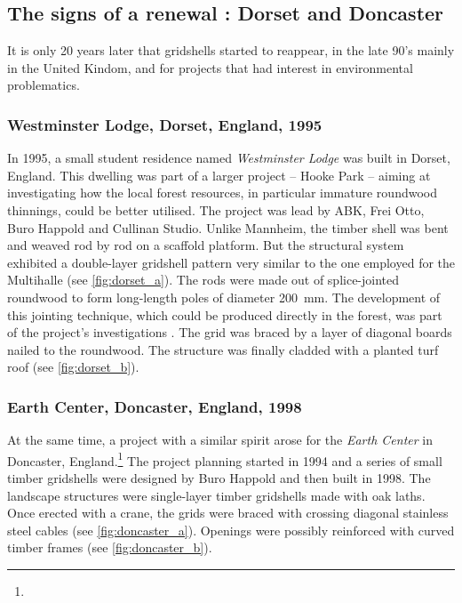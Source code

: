 \subsection{The signs of a renewal : Dorset and Doncaster}\label{sec=signs}

It is only 20 years later that gridshells started to reappear, in the late 90's mainly in the United Kindom, and for projects that had interest in environmental problematics.

\subsubsection{Westminster Lodge, Dorset, England, 1995}
In 1995, a small student residence named \emph{Westminster Lodge} was built in Dorset, England. This dwelling was part of a larger project -- Hooke Park -- aiming at investigating how the local forest resources, in particular immature roundwood thinnings, could be better utilised. The project was lead by ABK, Frei Otto, Buro Happold and Cullinan Studio. Unlike Mannheim, the timber shell was bent and weaved rod by rod on a scaffold platform. But the structural system exhibited a double-layer gridshell pattern very similar to the one employed for the Multihalle (see \cref{fig:dorset_a}). The rods were made out of splice-jointed roundwood to form long-length poles of diameter \SI{200}{mm}. The development of this jointing technique, which could be produced directly in the forest, was part of the project's investigations \cite{Burton1998}. The grid was braced by a layer of diagonal boards nailed to the roundwood. The structure was finally cladded with a planted turf roof (see \cref{fig:dorset_b}).

\subsubsection{Earth Center, Doncaster, England, 1998}
At the same time, a project with a similar spirit arose for the \emph{Earth Center} in Doncaster, England.\footnote{} The project planning started in 1994 and a series of small timber gridshells were designed by Buro Happold and then built in 1998. The landscape structures were single-layer timber gridshells made with oak laths. Once erected with a crane, the grids were braced with crossing diagonal stainless steel cables (see \cref{fig:doncaster_a}). Openings were possibly reinforced with curved timber frames (see \cref{fig:doncaster_b}).

